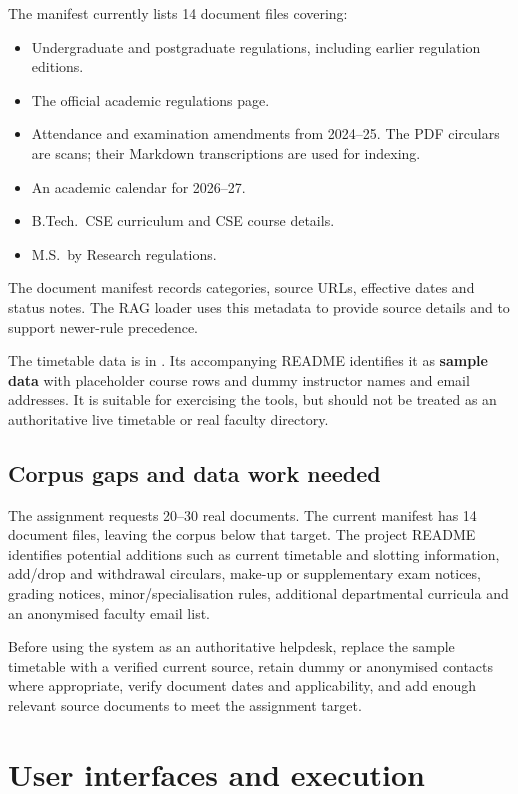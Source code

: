 \documentclass[11pt,a4paper]{article}
\newcommand{\code}[1]{\texttt{\detokenize{#1}}}
\begin{document}
The manifest currently lists 14 document files covering:
\begin{itemize}
  \item Undergraduate and postgraduate regulations, including earlier regulation editions.
  \item The official academic regulations page.
  \item Attendance and examination amendments from 2024--25. The PDF circulars are scans; their Markdown transcriptions are used for indexing.
  \item An academic calendar for 2026--27.
  \item B.Tech.\ CSE curriculum and CSE course details.
  \item M.S.\ by Research regulations.
\end{itemize}

The document manifest records categories, source URLs, effective dates and status notes. The RAG loader uses this metadata to provide source details and to support newer-rule precedence.

The timetable data is in \code{data/csv/courses.csv}. Its accompanying README identifies it as \textbf{sample data} with placeholder course rows and dummy instructor names and email addresses. It is suitable for exercising the tools, but should not be treated as an authoritative live timetable or real faculty directory.

\subsection{Corpus gaps and data work needed}

The assignment requests 20--30 real documents. The current manifest has 14 document files, leaving the corpus below that target. The project README identifies potential additions such as current timetable and slotting information, add/drop and withdrawal circulars, make-up or supplementary exam notices, grading notices, minor/specialisation rules, additional departmental curricula and an anonymised faculty email list.

Before using the system as an authoritative helpdesk, replace the sample timetable with a verified current source, retain dummy or anonymised contacts where appropriate, verify document dates and applicability, and add enough relevant source documents to meet the assignment target.

\section{User interfaces and execution}
\end{document}
